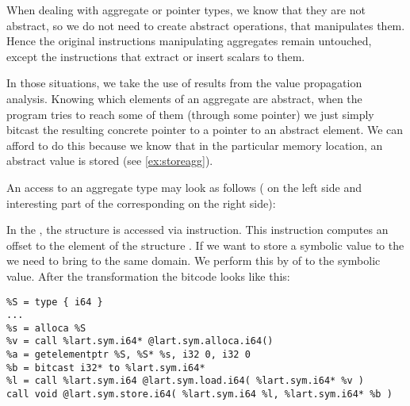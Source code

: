 When dealing with aggregate or pointer types, we know that they are not
abstract, so we do not need to create abstract operations, that manipulates
them. Hence the original instructions manipulating aggregates remain
untouched, except the instructions that extract or insert scalars to them.

In those situations, we take the use of results from the value propagation analysis.
Knowing which elements of an aggregate are abstract, when the program tries to
reach some of them (through some pointer) we just simply bitcast
the resulting concrete pointer to a pointer to an abstract element. We can afford
to do this because we know that in the particular memory location, an abstract value is
stored (see \autoref{ex:storeagg}).

\begin{example}\label{ex:storeagg}
An access to an aggregate type may look as follows (\Cpp{} on the left side and interesting
part of the corresponding \LLVM on the right side):

\bigskip
\noindent
{}
\hfill
{}

\bigskip
\noindent
In the \LLVM, the structure  is accessed via 
instruction. This instruction computes an offset to the element  of
the structure . If we want to store a symbolic value  to
the  we need to bring  to the same domain. We perform this
by  of  to the symbolic value. After the
transformation the \LLVM bitcode looks like this:
\begin{verbatim}
%S = type { i64 }
...
%s = alloca %S
%v = call %lart.sym.i64* @lart.sym.alloca.i64()
%a = getelementptr %S, %S* %s, i32 0, i32 0
%b = bitcast i32* to %lart.sym.i64*
%l = call %lart.sym.i64 @lart.sym.load.i64( %lart.sym.i64* %v )
call void @lart.sym.store.i64( %lart.sym.i64 %l, %lart.sym.i64* %b )
\end{verbatim}
\end{example}

